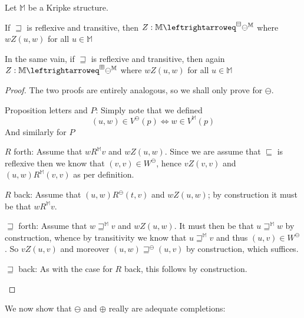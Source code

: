 \begin{lemma}\label{bmbpbisimlemma}
Let $\mathbb{M}$ be a Kripke structure.

If $\sqsupseteq$ is reflexive and transitive, then $Z: \mathbb{M}
\leftrightarroweq^\BM \ominus^\mathbb{M}$ where $w Z (u,w)$ for all $u \in \mathbb{M}$

In the same vain, if $\sqsupseteq$ is reflexive and transitive, then
again $Z: \mathbb{M}
\leftrightarroweq^\BP \ominus^\mathbb{M}$ where $w Z (u,w)$ for all $u \in \mathbb{M}$
\end{lemma}
\begin{proof}
The two proofs are entirely analogous, so we shall only prove for
$\ominus$.
\begin{bul}
  \item Proposition letters and $P$:  Simply note that we defined
\[ (u,w) \in V^\ominus(p) \iff w \in V^{\mathbb{M}}(p) \]
And similarly for $P$
\item $R$ forth:  Assume that $w R^\mathbb{M} v$ and $w Z (u,w)$.
  Since we are assume that $\sqsubseteq$ is reflexive then we know
  that $(v,v) \in W^\ominus$, hence $v Z (v,v)$ and $(u,w)
  R^\mathbb{M} (v,v)$ as per definition.
\item $R$ back:  Assume that $(u,w) R^\ominus (t,v)$ and $w Z (u,w)$;
  by construction it must be that $w R^{\mathbb{M}} v$.
\item $\sqsupseteq$ forth:  Assume that $w \sqsupseteq^{\mathbb{M}} v$ and $w Z
  (u,w)$.  It must then be that $u \sqsupseteq^{\mathbb{M}} w$ by construction,
  whence by transitivity we know that $u \sqsupseteq^{\mathbb{M}} v$ and thus
  $(u,v) \in W^\ominus$.  So $v Z (u,v)$ and moreover $(u,w)
  \sqsupseteq^\ominus (u,v)$ by construction, which suffices.
\item $\sqsupseteq$ back: As with the case for $R$ back, this follows
  by construction.
\end{bul}
\end{proof}

We now show that $\ominus$ and $\oplus$ really are adequate completions:

